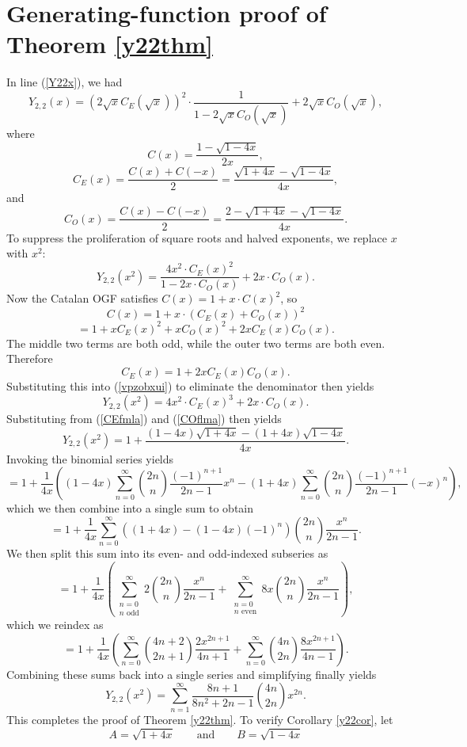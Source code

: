 \documentclass[10pt]{article}
\newcommand{\eqn}[1]{\begin{equation*} #1 \end{equation*}}
\newcommand{\neqn}[1]{\begin{equation} #1 \end{equation}}
\newcommand{\qquadtext}[1]{\qquad \text{#1} \qquad}
\begin{document}
\section{Generating-function proof of Theorem \ref{y22thm}}\label{app:alg}
In line (\ref{Y22x}), we had
\eqn{Y_{2,2}(x) = \left( 2\sqrt{x} C_E(\sqrt{x}) \right)^2 \cdot \frac{1}{1 - 2\sqrt{x} C_O(\sqrt{x})} + 2\sqrt{x} C_O(\sqrt{x}),}
where
\eqn{C(x) = \frac{1-\sqrt{1-4x}}{2x},}
\neqn{C_E(x) = \frac{C(x)+C(-x)}{2} = \frac{\sqrt{1+4x} - \sqrt{1-4x}}{4x}, \label{CEfmla}}
and
\neqn{C_O(x) = \frac{C(x)-C(-x)}{2} = \frac{2 - \sqrt{1+4x} - \sqrt{1-4x}}{4x}. \label{COflma}}
To suppress the proliferation of square roots and halved exponents, we replace $x$ with $x^2$:
\neqn{Y_{2,2}(x^2) = \frac{4x^2 \cdot C_E(x)^2}{1 - 2x \cdot C_O(x)} + 2x \cdot C_O(x). \label{vpzobxui}}
Now the Catalan OGF satisfies $C(x) = 1 + x \cdot C(x)^2$, so
\eqn{C(x) = 1 + x \cdot (C_E(x) + C_O(x))^2}
\eqn{ = 1 + x C_E(x)^2 + x C_O(x)^2 + 2 x C_E(x) C_O(x).}
The middle two terms are both odd, while the outer two terms are both even.  Therefore
\neqn{C_E(x) = 1 + 2 x C_E(x) C_O(x). \label{CECO}}
Substituting this into (\ref{vpzobxui}) to eliminate the denominator then yields
\eqn{Y_{2,2}(x^2) = 4x^2 \cdot C_E(x)^3 + 2x \cdot C_O(x).}
Substituting from (\ref{CEfmla}) and (\ref{COflma}) then yields
\neqn{Y_{2,2}(x^2) = 1 + \frac{(1-4x) \sqrt{1+4x} - (1+4x) \sqrt{1-4x}}{4x}. \label{Y22x2}}
Invoking the binomial series yields
\eqn{ = 1 + \frac{1}{4x} \left( (1-4x) \sum_{n=0}^\infty \binom{2n}{n} \frac{(-1)^{n+1}}{2n-1} x^n - (1+4x) \sum_{n=0}^\infty \binom{2n}{n} \frac{(-1)^{n+1}}{2n-1} (-x)^n \right),}
which we then combine into a single sum to obtain
\eqn{ = 1 + \frac{1}{4x} \sum_{n=0}^\infty \left( (1+4x) - (1-4x) (-1)^n\right) \binom{2n}{n} \frac{x^n}{2n-1}.}
We then split this sum into its even- and odd-indexed subseries as
\eqn{ = 1 + \frac{1}{4x} \left( \sum_{\substack{n=0 \\ n \text{ odd}}}^\infty 2 \binom{2n}{n} \frac{x^n}{2n-1} + \sum_{\substack{n=0 \\ n \text{ even}}}^\infty 8x \binom{2n}{n} \frac{x^n}{2n-1} \right),}
which we reindex as
\eqn{ = 1 + \frac{1}{4x} \left( \sum_{n=0}^\infty \binom{4n+2}{2n+1} \frac{2x^{2n+1}}{4n+1} + \sum_{n=0}^\infty \binom{4n}{2n} \frac{8x^{2n+1}}{4n-1} \right).}
Combining these sums back into a single series and simplifying finally yields
\eqn{Y_{2,2}(x^2) = \sum_{n=1}^\infty \frac{8n+1}{8n^2+2n-1} \binom{4n}{2n} x^{2n}.}
This completes the proof of Theorem \ref{y22thm}. To verify Corollary \ref{y22cor}, let
\eqn{A = \sqrt{1+4x} \qquadtext{and} B = \sqrt{1-4x}}
\end{document}
